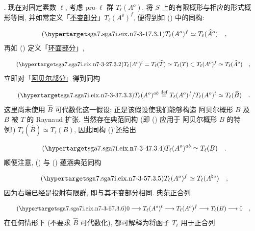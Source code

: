 \medskip
\noindent
{}. 现在对固定素数 $\ell$, 考虑 pro-$\ell$ 群 $T_{\ell}(A^{o})$. 将 $S$ 上的有限概形与相应的形式概形等同, 并如常定义「\underline{不变部分}」$T_{\ell}(A^{o})^{f}$, 便得到如 () 中的同构:

\begin{equation}\tag{\SGARefTarget{sga7.sga7i.eix.n7-3-1}{7.3.1}}
T_{\ell}(A^{o})^{f} \simeq T_{\ell}(\widehat{A}^{o}) \quad ,
\end{equation}
再如 () 定义「\underline{环面部分}」,

\begin{equation}\tag{\SGARefTarget{sga7.sga7i.eix.n7-3-2}{7.3.2}}
T_{\ell}(A^{o})^{t} = T_{\ell}(\widehat{T}) \simeq T_{\ell}(T)
 \subset T_{\ell}(A^{o})^{f} \simeq T_{\ell}(\widehat{A}^{o}) \quad ,
\end{equation}
立即对「\underline{阿贝尔部分}」得到同构

\begin{equation}\tag{\SGARefTarget{sga7.sga7i.eix.n7-3-3}{7.3.3}}
T_{\ell}(A^{o})^{ab} \stackrel{\mathrm{def}}{=}
T_{\ell}(A^{o})^{f}/T_{\ell}(A^{o})^{t}
 \simeq T_{\ell}(\widehat{B}) \quad .
\end{equation}
这里尚未使用 $\widehat B$ 可代数化这一假设; 正是该假设使我们能够构造 阿贝尔概形 $B$ 及 $B$ 被 $T$ 的 Raynaud 扩张. 当然存在典范同构 (即 () 应用于 阿贝尔概形 $B$ 的特例!) $T_{\ell}(\widehat B)\simeq T_{\ell}(B)$, 因此同构 () 还给出

\begin{equation}\tag{\SGARefTarget{sga7.sga7i.eix.n7-3-4}{7.3.4}}
T_{\ell}(A^{o})^{ab} \simeq T_{\ell}(B) \quad .
\end{equation}
顺便注意, () 与 () 蕴涵典范同构

\begin{equation}\tag{\SGARefTarget{sga7.sga7i.eix.n7-3-5}{7.3.5}}
T_{\ell}(A^{o})^{f} \simeq T_{\ell}(A^{\natural o}) \quad ,
\end{equation}
因为右端已经是投射有限群, 即与其不变部分相同. 典范正合列

\begin{equation}\tag{\SGARefTarget{sga7.sga7i.eix.n7-3-6}{7.3.6}}
0 \longrightarrow T_{\ell}(A^{o})^{t}
 \longrightarrow T_{\ell}(A^{o})^{f}
 \longrightarrow T_{\ell}(B) \longrightarrow 0 \quad ,
\end{equation}
在任何情形下 (不要求 $\widehat B$ 可代数化), 都可解释为将函子 $T_{\ell}$ 用于正合列

